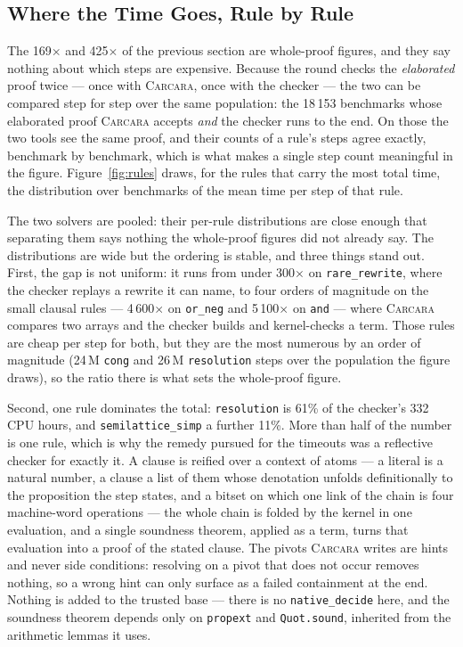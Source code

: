 \documentclass[runningheads]{llncs}
\newcommand{\carcara}{\textsc{Carcara}\xspace}
\newcommand{\rulename}[1]{\texttt{#1}}
\begin{document}
\subsection{Where the Time Goes, Rule by Rule}
\label{sec:perrule}

The 169$\times$ and 425$\times$ of the previous section are whole-proof
figures, and they say nothing about which steps are expensive. Because the
round checks the \emph{elaborated} proof twice --- once with \carcara, once
with the checker --- the two can be compared step for step over the same
population: the 18\,153 benchmarks whose elaborated proof \carcara accepts
\emph{and} the checker runs to the end. On those the two tools see the same
proof, and their counts of a rule's steps agree exactly, benchmark by
benchmark, which is what makes a single step count meaningful in the figure.
Figure~\ref{fig:rules} draws, for the rules that carry the most
total time, the distribution over benchmarks of the mean time per step of that
rule.

The two solvers are pooled: their per-rule distributions are close enough that
separating them says nothing the whole-proof figures did not already say.
The distributions are wide but the ordering is stable, and three things stand
out. First, the gap is not uniform: it runs from under 300$\times$ on
\rulename{rare\_rewrite}, where the checker replays a rewrite it can name, to
four orders of magnitude on the
small clausal rules --- 4\,600$\times$ on \rulename{or\_neg} and
5\,100$\times$ on \rulename{and} --- where \carcara compares two
arrays and the checker builds and kernel-checks a term. Those rules are cheap
per step for both, but they are the most numerous by an order of magnitude
(24\,M \rulename{cong} and 26\,M \rulename{resolution} steps over the
population the figure draws), so the ratio there is what sets the whole-proof
figure.

Second, one rule dominates the total: \rulename{resolution} is 61\% of the
checker's 332 CPU hours, and \rulename{semilattice\_simp} a further 11\%. More
than half of the number is one rule, which is why the remedy pursued for the
timeouts was a reflective checker for exactly it. A clause is reified over a context of atoms --- a literal
is a natural number, a clause a list of them whose denotation unfolds
definitionally to the proposition the step states, and a bitset on which one
link of the chain is four machine-word operations --- the whole chain is folded
by the kernel in one evaluation, and a single soundness theorem, applied as a
term, turns that evaluation into a proof of the stated clause. The pivots
\carcara writes are hints and never side conditions: resolving on a pivot that
does not occur removes nothing, so a wrong hint can only surface as a failed
containment at the end. Nothing is added to the trusted base --- there is no
\texttt{native\_decide} here, and the soundness theorem depends only on
\texttt{propext} and \texttt{Quot.sound}, inherited from the arithmetic lemmas
it uses.
\end{document}
